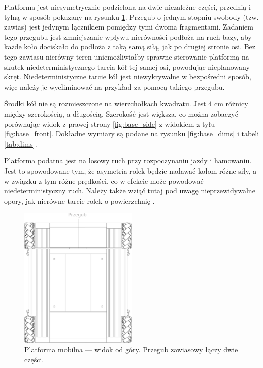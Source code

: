 Platforma jest niesymetrycznie podzielona na dwie niezależne części, przednią i tylną w sposób pokazany na rysunku \ref{fig:base_top}.
Przegub o jednym stopniu swobody (tzw. zawias) jest jedynym łącznikiem pomiędzy tymi dwoma fragmentami.
Zadaniem tego przegubu jest zmniejszanie wpływu nierówności podłoża na ruch bazy, aby każde koło dociskało do podłoża z taką samą siłą, jak po drugiej stronie osi.
Bez tego zawiasu nierówny teren uniemożliwiałby sprawne sterowanie platformą na skutek niedeterministycznego tarcia kół tej samej osi, powodując nieplanowany skręt.
Niedeterministyczne tarcie kół jest niewykrywalne w bezpośredni sposób, więc należy je wyeliminować na przykład za pomocą takiego przegubu.

Środki kół nie są rozmieszczone na wierzchołkach kwadratu. Jest 4 cm różnicy między szerokością, a długością.
Szerokość jest większa, co można zobaczyć porównując widok z prawej strony \ref{fig:base_side} z widokiem z tyłu \ref{fig:base_front}.
Dokładne wymiary są podane na rysunku \ref{fig:base_dims} i tabeli \ref{tab:dims}.

Platforma podatna jest na losowy ruch przy rozpoczynaniu jazdy i hamowaniu.
Jest to spowodowane tym, że asymetria rolek będzie nadawać kołom różne siły, a w związku z tym różne prędkości, co w efekcie może powodować niedeterministyczny ruch.
Należy także wziąć tutaj pod uwagę nieprzewidywalne opory, jak nierówne tarcie rolek o powierzchnię \cite{braking}.

\begin{figure}[H]
\centering
 \includegraphics[width=0.5\textwidth]{graphics/base_top.pdf}
\caption{Platforma mobilna --- widok od góry. Przegub zawiasowy łączy dwie części.}
\label{fig:base_top}
\end{figure} 


